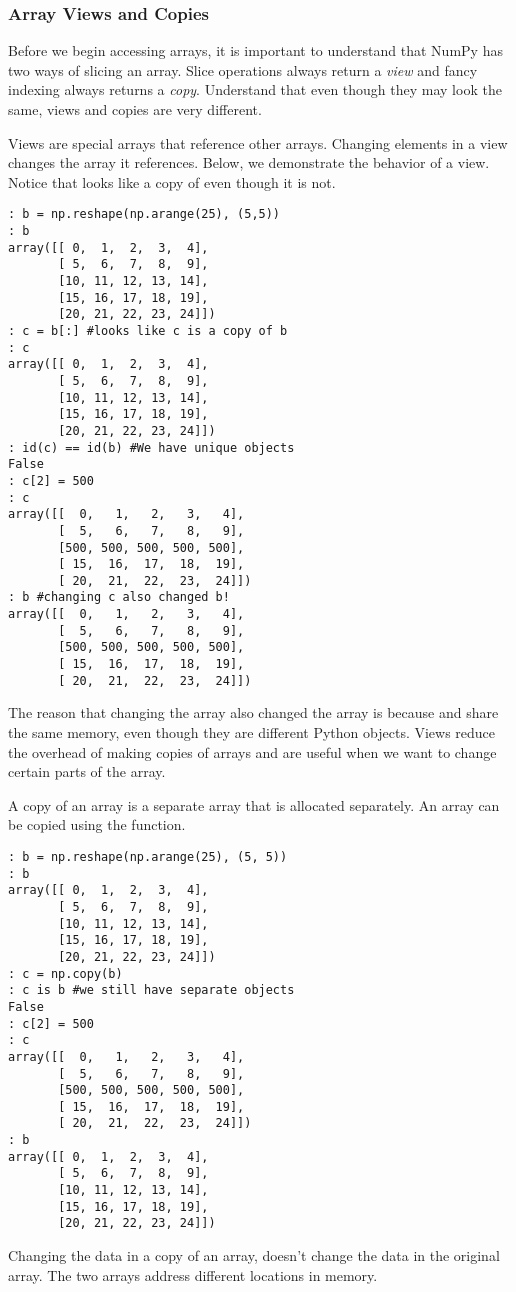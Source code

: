 \subsubsection*{Array Views and Copies}
Before we begin accessing arrays, it is important to understand that NumPy has two ways of slicing an array.
Slice operations always return a \emph{view} and fancy indexing always returns a \emph{copy}.
Understand that even though they may look the same, views and copies are very different.

Views are special arrays that reference other arrays.
Changing elements in a view changes the array it references.
Below, we demonstrate the behavior of a view.
Notice that  looks like a copy of  even though it is not.
\begin{lstlisting}
: b = np.reshape(np.arange(25), (5,5))
: b
array([[ 0,  1,  2,  3,  4],
       [ 5,  6,  7,  8,  9],
       [10, 11, 12, 13, 14],
       [15, 16, 17, 18, 19],
       [20, 21, 22, 23, 24]])
: c = b[:] #looks like c is a copy of b
: c
array([[ 0,  1,  2,  3,  4],
       [ 5,  6,  7,  8,  9],
       [10, 11, 12, 13, 14],
       [15, 16, 17, 18, 19],
       [20, 21, 22, 23, 24]])
: id(c) == id(b) #We have unique objects
False
: c[2] = 500
: c
array([[  0,   1,   2,   3,   4],
       [  5,   6,   7,   8,   9],
       [500, 500, 500, 500, 500],
       [ 15,  16,  17,  18,  19],
       [ 20,  21,  22,  23,  24]])
: b #changing c also changed b!
array([[  0,   1,   2,   3,   4],
       [  5,   6,   7,   8,   9],
       [500, 500, 500, 500, 500],
       [ 15,  16,  17,  18,  19],
       [ 20,  21,  22,  23,  24]])
\end{lstlisting}
The reason that changing the array  also changed the array  is because  and  share the same memory, even though they are different Python objects.
Views reduce the overhead of making copies of arrays and are useful when we want to change certain parts of the array.

A copy of an array is a separate array that is allocated separately.
An array can be copied using the  function.
\begin{lstlisting}
: b = np.reshape(np.arange(25), (5, 5))
: b
array([[ 0,  1,  2,  3,  4],
       [ 5,  6,  7,  8,  9],
       [10, 11, 12, 13, 14],
       [15, 16, 17, 18, 19],
       [20, 21, 22, 23, 24]])
: c = np.copy(b)
: c is b #we still have separate objects
False
: c[2] = 500
: c
array([[  0,   1,   2,   3,   4],
       [  5,   6,   7,   8,   9],
       [500, 500, 500, 500, 500],
       [ 15,  16,  17,  18,  19],
       [ 20,  21,  22,  23,  24]])
: b
array([[ 0,  1,  2,  3,  4],
       [ 5,  6,  7,  8,  9],
       [10, 11, 12, 13, 14],
       [15, 16, 17, 18, 19],
       [20, 21, 22, 23, 24]])
\end{lstlisting}
Changing the data in a copy of an array, doesn't change the data in the original array.
The two arrays address different locations in memory.

